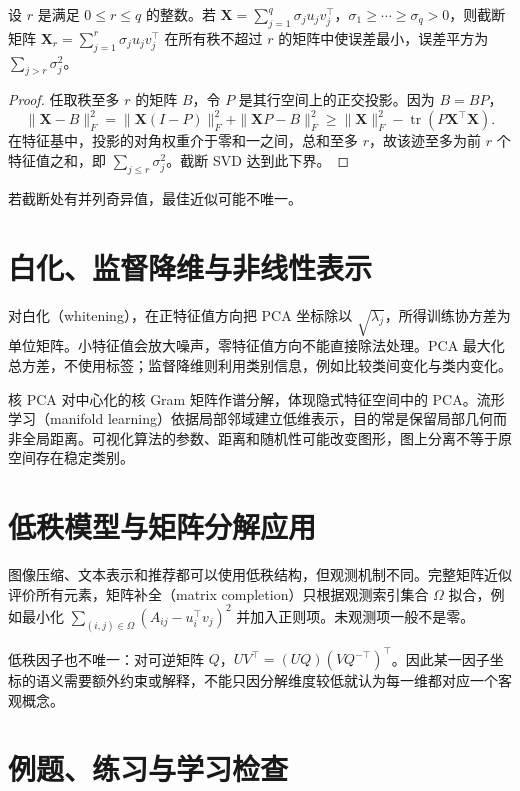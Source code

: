 \begin{theorem}
设 $r$ 是满足 $0\leq r\leq q$ 的整数。若 $\mathbf X=\sum_{j=1}^{q}\sigma_ju_jv_j^\top$，$\sigma_1\geq\cdots\geq\sigma_q>0$，则截断矩阵 $\mathbf X_r=\sum_{j=1}^{r}\sigma_ju_jv_j^\top$ 在所有秩不超过 $r$ 的矩阵中使误差最小，误差平方为 $\sum_{j>r}\sigma_j^2$。
\end{theorem}
\begin{proof}
任取秩至多 $r$ 的矩阵 $B$，令 $P$ 是其行空间上的正交投影。因为 $B=BP$，
\[
 \|\mathbf X-B\|_F^2
 =\|\mathbf X(I-P)\|_F^2+\|\mathbf XP-B\|_F^2
 \geq\|\mathbf X\|_F^2-\operatorname{tr}(P\mathbf X^\top\mathbf X).
\]
在特征基中，投影的对角权重介于零和一之间，总和至多 $r$，故该迹至多为前 $r$ 个特征值之和，即 $\sum_{j\leq r}\sigma_j^2$。截断 SVD 达到此下界。
\end{proof}
若截断处有并列奇异值，最佳近似可能不唯一。

\section{白化、监督降维与非线性表示}

对白化（whitening），在正特征值方向把 PCA 坐标除以 $\sqrt{\lambda_j}$，所得训练协方差为单位矩阵。小特征值会放大噪声，零特征值方向不能直接除法处理。PCA 最大化总方差，不使用标签；监督降维则利用类别信息，例如比较类间变化与类内变化。

核 PCA 对中心化的核 Gram 矩阵作谱分解，体现隐式特征空间中的 PCA。流形学习（manifold learning）依据局部邻域建立低维表示，目的常是保留局部几何而非全局距离。可视化算法的参数、距离和随机性可能改变图形，图上分离不等于原空间存在稳定类别。

\section{低秩模型与矩阵分解应用}

图像压缩、文本表示和推荐都可以使用低秩结构，但观测机制不同。完整矩阵近似评价所有元素，矩阵补全（matrix completion）只根据观测索引集合 $\Omega$ 拟合，例如最小化 $\sum_{(i,j)\in\Omega}(A_{ij}-u_i^\top v_j)^2$ 并加入正则项。未观测项一般不是零。

低秩因子也不唯一：对可逆矩阵 $Q$，$UV^\top=(UQ)(VQ^{-\top})^\top$。因此某一因子坐标的语义需要额外约束或解释，不能只因分解维度较低就认为每一维都对应一个客观概念。

\section{例题、练习与学习检查}

